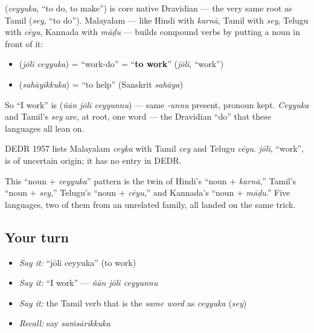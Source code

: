 \begin{cousinweb}
\textbf{} (\emph{ceyyuka}, \textquotedblleft{}to do, to make\textquotedblright{}) is core native Dravidian — the very same root as Tamil \textbf{} (\emph{sey}, \textquotedblleft{}to do\textquotedblright{}). Malayalam — like Hindi with \emph{karnā}, Tamil with \emph{sey}, Telugu with \emph{cēyu}, Kannada with \emph{māḍu} — builds compound verbs by putting a noun in front of it:

\begin{itemize}
\raggedright
  \item \textbf{ } (\emph{jōli ceyyuka}) = \textquotedblleft{}work-do\textquotedblright{} = \textquotedblleft{}\textbf{to work}\textquotedblright{} (\emph{jōli}, \textquotedblleft{}work\textquotedblright{})
  \item \textbf{} (\emph{sahāyikkuka}) = \textquotedblleft{}to help\textquotedblright{} (Sanskrit \emph{sahāya})
\end{itemize}

So \textquotedblleft{}I work\textquotedblright{} is \textbf{  } (\emph{ñān jōli ceyyunnu}) — same \emph{-unnu} present, pronoun kept. \emph{Ceyyuka} and Tamil's \emph{sey} are, at root, one word — the Dravidian \textquotedblleft{}do\textquotedblright{} that these languages all lean on.

DEDR 1957 lists Malayalam \emph{ceyka} with Tamil \emph{cey} and Telugu \emph{cēyu}. \emph{jōli}, \textquotedblleft{}work\textquotedblright{}, is of uncertain origin; it has no entry in DEDR.
\end{cousinweb}

\begin{grammarlens}[title={Grammar Lens: noun + \ml{ചെയ്യുക} = a new verb}]
This \textquotedblleft{}noun + \emph{ceyyuka}\textquotedblright{} pattern is the twin of Hindi's \textquotedblleft{}noun + \emph{karnā},\textquotedblright{} Tamil's \textquotedblleft{}noun + \emph{sey},\textquotedblright{} Telugu's \textquotedblleft{}noun + \emph{cēyu},\textquotedblright{} and Kannada's \textquotedblleft{}noun + \emph{māḍu}.\textquotedblright{} Five languages, two of them from an unrelated family, all landed on the same trick.
\end{grammarlens}

\subsection*{Your turn}
\begin{itemize}
\raggedright
  \item \emph{Say it:} \textquotedblleft{}jōli ceyyuka\textquotedblright{} (to work)
  \item \emph{Say it:} \textquotedblleft{}I work\textquotedblright{} — \emph{ñān jōli ceyyunnu}
  \item \emph{Say it:} the Tamil verb that is the \emph{same word} as \emph{ceyyuka} (\emph{sey})
  \item \emph{Recall:} say \emph{saṁsārikkuka}
\end{itemize}

